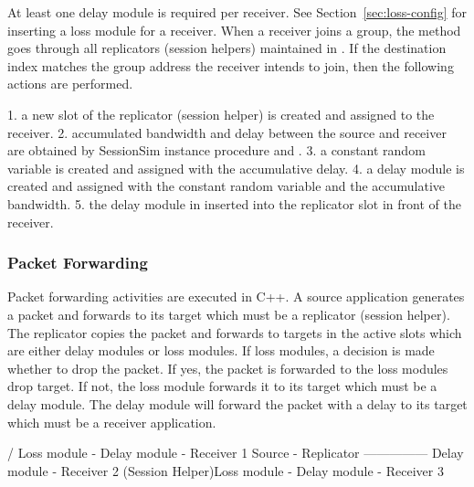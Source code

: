 \documentclass{article}
\begin{document}
At least one delay module is required per receiver.
See Section~\ref{sec:loss-config} for inserting a loss module for a receiver.
When a receiver joins a group, 
the  method goes through
all replicators (session helpers) maintained in .
If the destination index matches the group address
the receiver intends to join, then the following actions are performed.

1. a new slot of the replicator (session helper) is created and assigned to the receiver.
2. accumulated bandwidth and delay between the source and receiver are obtained by SessionSim instance procedure  and .
3. a constant random variable is created and assigned with the
accumulative delay.
4. a delay module is created and assigned with the constant random 
variable and the accumulative bandwidth.
5. the delay module in inserted into the replicator slot in
front of the receiver.



\subsubsection{Packet Forwarding}
Packet forwarding activities are executed in C++.  A source application 
generates a packet and forwards to its target which must be a replicator 
(session helper).  The replicator copies the packet and forwards 
to targets in the active slots which are either delay modules or loss modules. If loss modules, a decision is made whether to drop the packet.
If yes, the packet is forwarded to the loss modules drop target.  If not,
the loss module forwards it to its target which must be a delay module.
The delay module will forward the packet with a delay to its target which
must be a receiver application.

\begin{program}
                    / Loss module - Delay module - Receiver 1
Source - Replicator --------------- Delay module - Receiver 2
    (Session Helper)\bs Loss module - Delay module - Receiver 3

\end{program}
\end{document}
